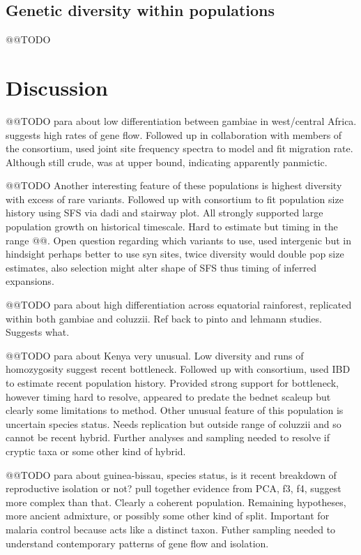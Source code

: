 \documentclass[a4paper,11pt,abstracton,hidelinks]{scrartcl}
\begin{document}
\subsection{Genetic diversity within populations}\label{subsec:diversity}


@@TODO


\section{Discussion}\label{sec:discussion}


@@TODO para about low differentiation between gambiae in west/central Africa. suggests high rates of gene flow. Followed up in collaboration with members of the consortium, used joint site frequency spectra to model and fit migration rate. Although still crude, was at upper bound, indicating apparently panmictic.


@@TODO Another interesting feature of these populations is highest diversity with excess of rare variants. Followed up with consortium to fit population size history using SFS via dadi and stairway plot. All strongly supported large population growth on historical timescale. Hard to estimate but timing in the range @@. Open question regarding which variants to use, used intergenic but in hindsight perhaps better to use syn sites, twice diversity would double pop size estimates, also selection might alter shape of SFS thus timing of inferred expansions.


@@TODO para about high differentiation across equatorial rainforest, replicated within both gambiae and coluzzii. Ref back to pinto and lehmann studies. Suggests what.


@@TODO para about Kenya very unusual. Low diversity and runs of homozygosity suggest recent bottleneck. Followed up with consortium, used IBD to estimate recent population history. Provided strong support for bottleneck, however timing hard to resolve, appeared to predate the bednet scaleup but clearly some limitations to method. Other unusual feature of this population is uncertain species status. Needs replication but outside range of coluzzii and so cannot be recent hybrid. Further analyses and sampling needed to resolve if cryptic taxa or some other kind of hybrid.


@@TODO para about guinea-bissau, species status, is it recent breakdown of reproductive isolation or not? pull together evidence from PCA, f3, f4, suggest more complex than that. Clearly a coherent population. Remaining hypotheses, more ancient admixture, or possibly some other kind of split. Important for malaria control because acts like a distinct taxon. Futher sampling needed to understand contemporary patterns of gene flow and isolation.
\end{document}
